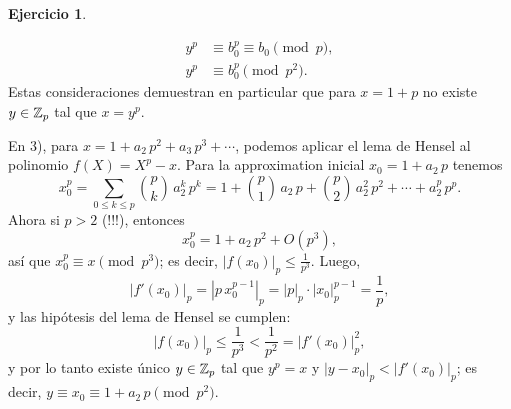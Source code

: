 \documentclass{article}
\numberwithin{equation}{section}
\theoremstyle{definition}
\newtheorem{ejerc}{Ejercicio}
\begin{document}
\begin{ejerc}
\begin{solucion}
    \begin{align*}
      y^p & \equiv b_0^p \equiv b_0 \pmod{p},\\
      y^p & \equiv b_0^p \pmod{p^2}.
    \end{align*}
    Estas consideraciones demuestran en particular que para
    $x = 1 + p$ no existe $y\in\mathbb{Z}_p$ tal que $x = y^p$.

    En 3), para $x = 1 + a_2\,p^2 + a_3\,p^3 + \cdots$, podemos aplicar el lema
    de Hensel al polinomio $f (X) = X^p - x$. Para la approximation inicial
    $x_0 = 1 + a_2\,p$ tenemos
    \[ x_0^p =
       \sum_{0 \le k \le p} {p \choose k} \, a_2^k\,p^k =
       1 + {p \choose 1}\,a_2\,p + {p \choose 2}\,a_2^2\,p^2 + \cdots + a_2^p\,p^p. \]
    Ahora si $p > 2$ (!!!), entonces
    $$x_0^p = 1 + a_2\,p^2 + O (p^3),$$
    así que $x_0^p \equiv x \pmod{p^3}$; es decir,
    $|f (x_0)|_p \le \frac{1}{p^3}$. Luego,
    $$|f' (x_0)|_p = |p\,x_0^{p-1}|_p = |p|_p\cdot |x_0|_p^{p-1} = \frac{1}{p},$$
    y las hipótesis del lema de Hensel se cumplen:
    $$|f (x_0)|_p \le \frac{1}{p^3} < \frac{1}{p^2} = |f' (x_0)|_p^2,$$
    y por lo tanto existe único $y\in\mathbb{Z}_p$ tal que $y^p = x$ y
    $|y-x_0|_p < |f' (x_0)|_p$; es decir,
    $y \equiv x_0 \equiv 1 + a_2\,p \pmod{p^2}$.
  \end{solucion}\fi
\end{ejerc}
\end{document}

